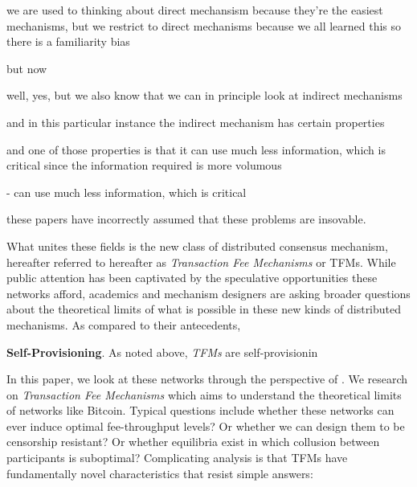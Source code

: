 \documentclass[sigconf,anonymous]{aamas}
\renewcommand{\paragraph}[1]{\smallskip\noindent\textbf{#1}}
\begin{document}
we are used to thinking about direct mechansism because they're the easiest mechanisms, but we restrict to direct mechanisms because we all learned this so there is a familiarity bias

but now 

well, yes, but we also know that we can in principle look at indirect mechanisms 

and in this particular instance the indirect mechanism has certain properties

	and one of those properties is that it can use much less information, which is critical since the information required is more volumous

	- can use much less information, which is critical 


these papers have incorrectly assumed that these problems are insovable.






What unites these fields is the new class of distributed consensus mechanism, hereafter referred to hereafter as \emph{Transaction Fee Mechanisms} or TFMs. While public attention has been captivated by the speculative opportunities these networks afford, academics and mechanism designers are asking broader questions about the theoretical limits of what is possible in these new kinds of distributed mechanisms. As compared to their antecedents, 


\paragraph{Self-Provisioning}. As noted above, \textit{TFMs} are self-provisionin

In this paper, we look at these networks through the perspective of . We 
research on \emph{Transaction Fee Mechanisms} which aims to understand the theoretical limits of networks like Bitcoin. Typical questions include whether these networks can ever induce optimal fee-throughput levels? Or whether we can design them to be censorship resistant? Or whether equilibria exist in which collusion between participants is suboptimal? Complicating analysis is that TFMs have fundamentally novel characteristics that resist simple answers:
\end{document}
